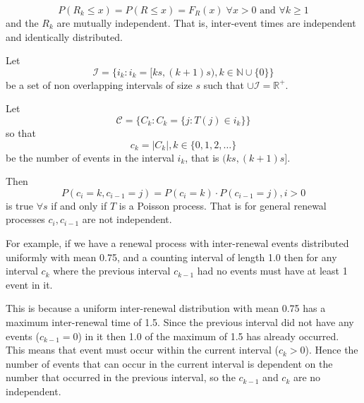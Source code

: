 \[ P(R_k \leq x) = P(R \leq x) = F_R(x) \; \forall x > 0 \mbox{ and } \forall k\geq 1 \]
and the $R_k$ are mutually independent.  That is, inter-event times
are independent and identically distributed.

Let
\[{\mathcal I} = \{i_k : i_k = [ks,(k+1)s) , k \in {\mathbb N} \cup \{0\}\} \]
be a set of non overlapping intervals of size $s$ such that $\cup
{\mathcal I} = {\mathbb R}^+$.

Let
\[{\mathcal C} = \{C_k : C_k = \{ j : T(j) \in i_k \} \} \]
so that
\[
c_k = |C_k|, k \in \{ 0,1,2,\ldots \}
\]
be the number of events in the interval $i_k$, that is $(ks, (k+1)s]$.

Then
\[
P(c_i = k, c_{i-1} = j) = P(c_i = k) \cdot P(c_{i-1} = j), i > 0
\]
is true $\forall s$ if and only if $T$ is a Poisson process.  That is for
general renewal processes $c_i, c_{i-1}$ are not independent.

For example, if we have a renewal process with inter-renewal events
distributed uniformly with mean 0.75, and a counting interval of
length 1.0 then for any interval $c_k$ where the previous interval
$c_{k-1}$ had no events must have at least 1 event in it.

This is because a uniform inter-renewal distribution with mean 0.75
has a maximum inter-renewal time of 1.5.  Since the previous interval
did not have any events ($c_{k-1} = 0$) in it then 1.0 of the maximum
of 1.5 has already occurred.  This means that event must occur within
the current interval ($c_k > 0$).  Hence the number of events that can
occur in the current interval is dependent on the number that occurred
in the previous interval, so the $c_{k-1}$ and $c_k$ are no
independent.
